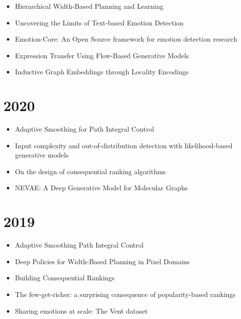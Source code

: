 \documentclass{article}
\begin{document}
\begin{itemize}
\item Hierarchical Width-Based Planning and Learning~\cite{junyent2021hierarchical}
\item Uncovering the Limits of Text-based Emotion Detection~\cite{nur21b}
\item Emotion-Core: An Open Source framework for emotion detection research~\cite{nur21c}
\item Expression Transfer Using Flow-Based Generative Models~\cite{Valenzuela_2021_CVPR}
\item Inductive Graph Embeddings through Locality Encodings~\cite{nur21a}
\end{itemize}

\section*{2020}
\begin{itemize}
\item Adaptive Smoothing for Path Integral Control~\cite{JMLR:v21:18-624}
\item Input complexity and out-of-distribution detection with likelihood-based generative models~\cite{serra2020}
\item On the design of consequential ranking algorithms~\cite{pmlr-v124-tabibian20a}
\item NEVAE: A Deep Generative Model for Molecular Graphs~\cite{JMLR:v21:19-671}
\end{itemize}
\section*{2019}
\begin{itemize}
\item Adaptive Smoothing Path Integral Control~\cite{thalmeier2019}
\item Deep Policies for Width-Based Planning in Pixel Domains~\cite{junyent2019}
\item Building Consequential Rankings~\cite{Tabibian2019}
\item The few-get-richer: a surprising consequence of popularity-based rankings~\cite{fewgetricher2019}
\item Sharing emotions at scale: The Vent dataset~\cite{vent}
\end{itemize}
\end{document}
